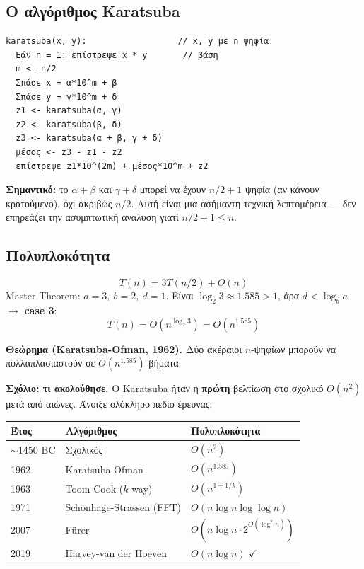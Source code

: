 \documentclass[11pt,a4paper]{article}
\begin{document}
\subsection{Ο αλγόριθμος Karatsuba}

\begin{codebox}
\begin{verbatim}
karatsuba(x, y):                  // x, y με n ψηφία
  Εάν n = 1: επίστρεψε x * y       // βάση
  m <- n/2
  Σπάσε x = α*10^m + β
  Σπάσε y = γ*10^m + δ
  z1 <- karatsuba(α, γ)
  z2 <- karatsuba(β, δ)
  z3 <- karatsuba(α + β, γ + δ)
  μέσος <- z3 - z1 - z2
  επίστρεψε z1*10^(2m) + μέσος*10^m + z2
\end{verbatim}
\end{codebox}
\textbf{Σημαντικό:} το $\alpha + \beta$ και $\gamma + \delta$ μπορεί να έχουν
$n/2 + 1$ ψηφία (αν κάνουν κρατούμενο), όχι ακριβώς $n/2$. Αυτή είναι μια
ασήμαντη τεχνική λεπτομέρεια --- δεν επηρεάζει την ασυμπτωτική ανάλυση γιατί
$n/2 + 1 \le n$.

\subsection{Πολυπλοκότητα}

\[
T(n) = 3 T(n/2) + O(n)
\]
Master Theorem: $a = 3,\ b = 2,\ d = 1$. Είναι $\log_2 3 \approx 1.585 > 1$, άρα
$d < \log_b a$ $\to$ \textbf{case 3}:
\[
T(n) = O(n^{\log_2 3}) = O(n^{1.585})
\]

\begin{quoteblock}
\textbf{Θεώρημα (Karatsuba-Ofman, 1962).} Δύο ακέραιοι $n$-ψηφίων μπορούν να
πολλαπλασιαστούν σε $O(n^{1.585})$ βήματα.
\end{quoteblock}

\textbf{Σχόλιο: τι ακολούθησε.} Ο Karatsuba ήταν η \textbf{πρώτη} βελτίωση στο
σχολικό $O(n^2)$ μετά από αιώνες. Άνοιξε ολόκληρο πεδίο έρευνας:

\begin{center}
\begin{tabular}{@{}l l l@{}}
\toprule
Έτος & Αλγόριθμος & Πολυπλοκότητα \\
\midrule
$\sim$1450 BC & Σχολικός                 & $O(n^2)$ \\
1962          & Karatsuba-Ofman          & $O(n^{1.585})$ \\
1963          & Toom-Cook ($k$-way)      & $O(n^{1+1/k})$ \\
1971          & Schönhage-Strassen (FFT) & $O(n \log n \log \log n)$ \\
2007          & Fürer                    & $O(n \log n \cdot 2^{O(\log^* n)})$ \\
2019          & Harvey-van der Hoeven    & $O(n \log n)$ $\checkmark$ \\
\bottomrule
\end{tabular}
\end{center}
\end{document}

